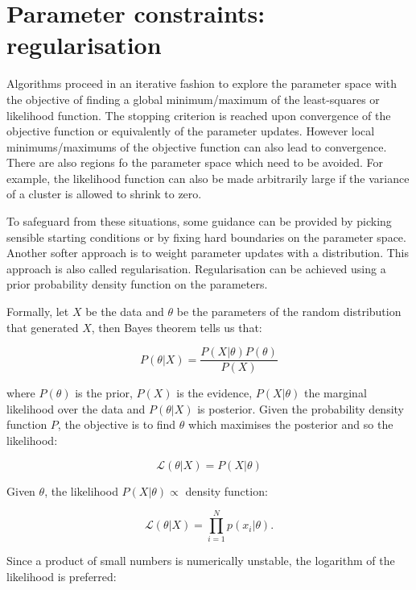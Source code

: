\section{Parameter constraints: regularisation} 

Algorithms proceed in an iterative fashion to explore the parameter space with the objective of finding a global minimum/maximum of the
least-squares or likelihood function.
The stopping criterion is reached upon convergence of the objective function or equivalently of the parameter updates.
However local minimums/maximums of the objective function can also lead to convergence.
There are also regions fo the parameter space which need to be avoided.
For example, the likelihood function can also be made arbitrarily large if the variance of a cluster is allowed to shrink to zero.

To safeguard from these situations,
some guidance can be provided by picking sensible starting conditions or by fixing hard boundaries on the parameter space.
Another softer approach is to weight parameter updates with a distribution.
This approach is also called regularisation.
Regularisation can be achieved using a prior probability density function on the parameters.

Formally, let $X$ be the data and $\theta$ be the parameters of the random distribution that generated $X$, then Bayes theorem tells us that:

\[
P(\theta|X) = \frac{P(X|\theta) P(\theta)}{P(X)}
\]

\noindent

where $P(\theta)$ is the prior, $P(X)$ is the evidence, $P(X|\theta)$ the marginal likelihood over the data and $P(\theta|X)$ is posterior.
Given the probability density function $P$, the objective is to find $\theta$ which maximises the posterior and so the likelihood:

\[
\mathcal{L}(\theta |X) = P(X | \theta)
\]

Given $\theta$, the likelihood $P(X|\theta) \propto $  density function:

\[
\mathcal{L}(\theta |X) = \prod_{i=1}^N p(x_i|\theta).
\]

Since a product of small numbers is numerically unstable, the logarithm of the likelihood is preferred:


